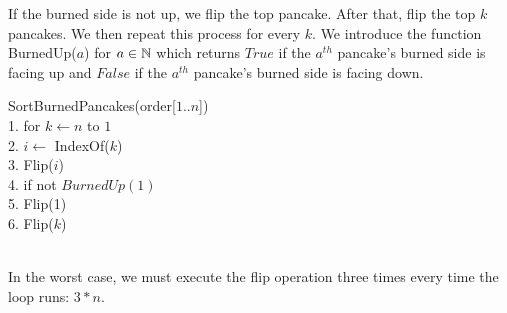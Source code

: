 \documentclass{article}
\begin{document}
\begin{enumerate}[label=\alph*.]
    If the burned side is not up, we flip the top pancake.
    After that, flip the top $k$ pancakes.
    We then repeat this process for every $k$. \parspace
    We introduce the function BurnedUp($a$) for $a \in {\mathbb N}$ which returns $True$ if the $a^{th}$ pancake's burned side is facing up and $False$ if the $a^{th}$ pancake's burned side is facing down.
    \begin{algorithm}
        SortBurnedPancakes(order[$1..n$])                   \\
        1. for $k \leftarrow n$ to $1$                      \\
        2. \hspace{2em} $i \leftarrow $ IndexOf($k$)        \\
        3. \hspace{2em} Flip($i$)                           \\
        4. \hspace{2em} if not $BurnedUp(1)$                \\
        5. \hspace{4em}     Flip(1)                         \\
        6. \hspace{2em} Flip($k$)
    \end{algorithm} \\
    In the worst case, we must execute the flip operation three times every time the loop runs: $3*n$.
\end{enumerate}

\end{document}
